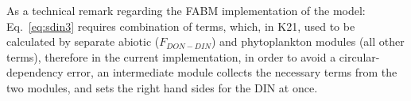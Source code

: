 \documentclass[gmd, manuscript, draft]{copernicus}
\begin{document}

As a technical remark regarding the FABM implementation of the model: Eq.~\eqref{eq:sdin3} requires combination of terms, which, in K21, used to be calculated by separate abiotic ($F_{DON-DIN}$) and phytoplankton modules (all other terms), therefore in the current implementation, in order to avoid a circular-dependency error, an intermediate module collects the necessary terms from the two modules, and sets the right hand sides for the DIN at once.
\end{document}

